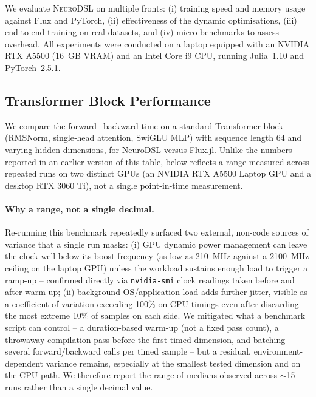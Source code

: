 \documentclass{article}
\begin{document}
We evaluate \textsc{NeuroDSL} on multiple fronts: (i) training speed and memory usage against Flux and PyTorch, (ii) effectiveness of the dynamic optimisations, (iii) end-to-end training on real datasets, and (iv) micro-benchmarks to assess overhead. All experiments were conducted on a laptop equipped with an NVIDIA RTX A5500 (16~GB VRAM) and an Intel Core i9 CPU, running Julia~1.10 and PyTorch~2.5.1.

\subsection{Transformer Block Performance}
\label{sec:transformer}
We compare the forward+backward time on a standard Transformer block (RMSNorm, single‑head attention, SwiGLU MLP) with sequence length 64 and varying hidden dimensions, for NeuroDSL versus Flux.jl. Unlike the numbers reported in an earlier version of this table,  below reflects a range measured across repeated runs on two distinct GPUs (an NVIDIA RTX A5500 Laptop GPU and a desktop RTX 3060 Ti), not a single point-in-time measurement.

\paragraph{Why a range, not a single decimal.} Re-running this benchmark repeatedly surfaced two external, non-code sources of variance that a single run masks: (i) GPU dynamic power management can leave the clock well below its boost frequency (as low as 210~MHz against a 2100~MHz ceiling on the laptop GPU) unless the workload sustains enough load to trigger a ramp-up -- confirmed directly via \texttt{nvidia-smi} clock readings taken before and after warm-up; (ii) background OS/application load adds further jitter, visible as a coefficient of variation exceeding 100\% on CPU timings even after discarding the most extreme 10\% of samples on each side. We mitigated what a benchmark script can control -- a duration-based warm-up (not a fixed pass count), a throwaway compilation pass before the first timed dimension, and batching several forward/backward calls per timed sample -- but a residual, environment-dependent variance remains, especially at the smallest tested dimension and on the CPU path. We therefore report the range of medians observed across $\sim$15 runs rather than a single decimal value.
\end{document}
